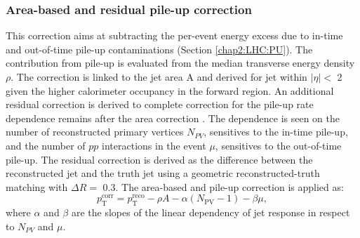 \subsubsection{Area-based and residual pile-up correction}
\label{Jet:Cal:chain:AreaPU}
This correction aims at subtracting the per-event energy excess due to in-time and out-of-time pile-up contaminations (Section \ref{chap2:LHC:PU}). The contribution from pile-up is evaluated from the median transverse energy density $\rho$. The correction is linked to the jet area A and derived for jet within $|\eta|<$ 2 given the higher calorimeter occupancy in the forward region. An additional residual correction is derived to complete correction for the pile-up rate dependence remains after the area correction \cite{PileUp_Sub}. The dependence is seen on the number of reconstructed primary vertices $N_{PV}$, sensitives to the in-time pile-up, and the number of $pp$ interactions in the event $\mu$, sensitives to the out-of-time pile-up. The residual correction is derived as the difference between the reconstructed jet \pT and the truth jet \pT using a geometric reconstructed-truth matching with $\Delta R= $ 0.3. The area-based and pile-up correction is applied as:
\begin{equation}
    p_{\mathrm{T}}^{\mathrm{corr}}=p_{\mathrm{T}}^{\mathrm{reco}}-\rho A-\alpha\left(N_{\mathrm{PV}}-1\right)-\beta \mu,
\end{equation}
where $\alpha$ and $\beta$ are the slopes of the linear dependency of jet response in respect to $N_{PV}$ and $\mu$.


